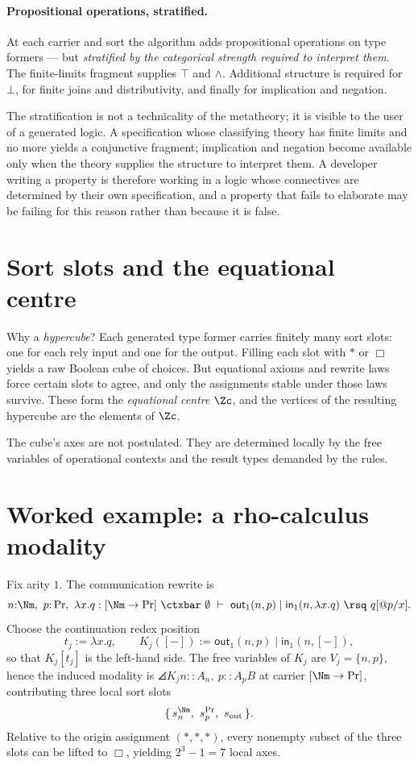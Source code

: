 \paragraph{Propositional operations, stratified.} At each carrier and sort the algorithm
adds propositional operations on type formers --- but \emph{stratified by the categorical
strength required to interpret them}. The finite-limits fragment supplies $\top$ and
$\wedge$. Additional structure is required for $\bot$, for finite joins and
distributivity, and finally for implication and negation.

\begin{remark}
\label{ob:rem:stratification}
The stratification is not a technicality of the metatheory; it is visible to the user of
a generated logic. A specification whose classifying theory has finite limits and no more
yields a conjunctive fragment; implication and negation become available only when the
theory supplies the structure to interpret them. A developer writing a property is
therefore working in a logic whose connectives are determined by their own specification,
and a property that fails to elaborate may be failing for this reason rather than because
it is false.
\end{remark}

\section{Sort slots and the equational centre}

Why a \emph{hypercube}? Each generated type former carries finitely many sort slots: one
for each rely input and one for the output. Filling each slot with $\ast$ or $\Box$ yields
a raw Boolean cube of choices. But equational axioms and rewrite laws force certain slots
to agree, and only the assignments stable under those laws survive. These form the
\emph{equational centre} $\Zc$, and the vertices of the resulting hypercube are the
elements of $\Zc$.

The cube's axes are not postulated. They are determined locally by the free variables of
operational contexts and the result types demanded by the rules.

\section{Worked example: a rho-calculus modality}
\label{ob:subsec:rho-modality}

Fix arity $1$. The communication rewrite is
\[
  n{:}\Nm,\ p{:}\Pr,\ \lambda x.q : [\Nm \to \Pr] \ \ctxbar\ \emptyset \ \vdash\
  \mathsf{out}_1(n,p) \mid \mathsf{in}_1(n, \lambda x.q) \ \rsq\ q[@p/x] .
\]
Choose the continuation redex position
\[
  t_j := \lambda x.q, \qquad K_j([-]) := \mathsf{out}_1(n,p) \mid \mathsf{in}_1(n,[-]) ,
\]
so that $K_j[t_j]$ is the left-hand side. The free variables of $K_j$ are
$V_j = \{n,p\}$, hence the induced modality is $\angles{K_j}{n :: A_n,\ p :: A_p}{B}$ at
carrier $[\Nm \to \Pr]$, contributing three local sort slots
\[
  \{\, s_n^{\Nm},\ s_p^{\Pr},\ s_{\mathrm{out}} \,\} .
\]
Relative to the origin assignment $(\ast,\ast,\ast)$, every nonempty subset of the three
slots can be lifted to $\Box$, yielding $2^3 - 1 = 7$ local axes.

